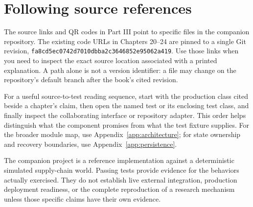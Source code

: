 \section{Following source references}

The source links and QR codes in Part III point to specific files in the companion repository. The existing code URLs in Chapters 20--24 are pinned to a single Git revision, \texttt{fa8cd5ec0742d701\allowbreak{}0dbba2c3646852e950\allowbreak{}62a419}. Use those links when you need to inspect the exact source location associated with a printed explanation. A path alone is not a version identifier: a file may change on the repository's default branch after the book's cited revision.

For a useful source-to-test reading sequence, start with the production class cited beside a chapter's claim, then open the named test or its enclosing test class, and finally inspect the collaborating interface or repository adapter. This order helps distinguish what the component promises from what the test fixture supplies. For the broader module map, use Appendix~\ref{app:architecture}; for state ownership and recovery boundaries, use Appendix~\ref{app:persistence}.

\begin{notebox}
The companion project is a reference implementation against a deterministic simulated supply-chain world. Passing tests provide evidence for the behaviors actually exercised. They do not establish live external integration, production deployment readiness, or the complete reproduction of a research mechanism unless those specific claims have their own evidence.
\end{notebox}
